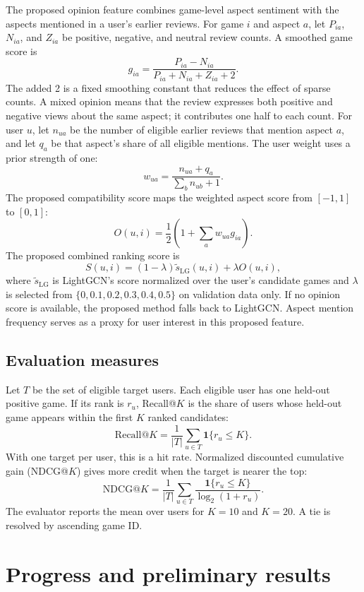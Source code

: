 \documentclass[11pt]{article}
\begin{document}
The proposed opinion feature combines game-level aspect sentiment with the aspects mentioned in a user's earlier reviews. For game $i$ and aspect $a$, let $P_{ia}$, $N_{ia}$, and $Z_{ia}$ be positive, negative, and neutral review counts. A smoothed game score is
\[
  g_{ia}=\frac{P_{ia}-N_{ia}}{P_{ia}+N_{ia}+Z_{ia}+2}.
\]
The added 2 is a fixed smoothing constant that reduces the effect of sparse counts. A mixed opinion means that the review expresses both positive and negative views about the same aspect; it contributes one half to each count.
For user $u$, let $n_{ua}$ be the number of eligible earlier reviews that mention aspect $a$, and let $q_a$ be that aspect's share of all eligible mentions. The user weight uses a prior strength of one:
\[
  w_{ua}=\frac{n_{ua}+q_a}{\sum_b n_{ub}+1}.
\]
The proposed compatibility score maps the weighted aspect score from $[-1,1]$ to $[0,1]$:
\[
  O(u,i)=\frac{1}{2}\left(1+\sum_a w_{ua}g_{ia}\right).
\]
The proposed combined ranking score is
\[
  S(u,i)=(1-\lambda)\widetilde{s}_{\mathrm{LG}}(u,i)+\lambda O(u,i),
\]
where $\widetilde{s}_{\mathrm{LG}}$ is LightGCN's score normalized over the user's candidate games and $\lambda$ is selected from $\{0,0.1,0.2,0.3,0.4,0.5\}$ on validation data only. If no opinion score is available, the proposed method falls back to LightGCN. Aspect mention frequency serves as a proxy for user interest in this proposed feature.

\subsection{Evaluation measures}

Let $T$ be the set of eligible target users. Each eligible user has one held-out positive game. If its rank is $r_u$, Recall@$K$ is the share of users whose held-out game appears within the first $K$ ranked candidates:
\[
  \mathrm{Recall@}K=\frac{1}{|T|}\sum_{u\in T}
  \mathbf{1}\{r_u\leq K\}.
\]
With one target per user, this is a hit rate. Normalized discounted cumulative gain (NDCG@$K$) gives more credit when the target is nearer the top:
\[
  \mathrm{NDCG@}K=\frac{1}{|T|}\sum_{u\in T}
  \frac{\mathbf{1}\{r_u\leq K\}}{\log_2(1+r_u)}.
\]
The evaluator reports the mean over users for $K=10$ and $K=20$. A tie is resolved by ascending game ID.

\section{Progress and preliminary results}
\end{document}
